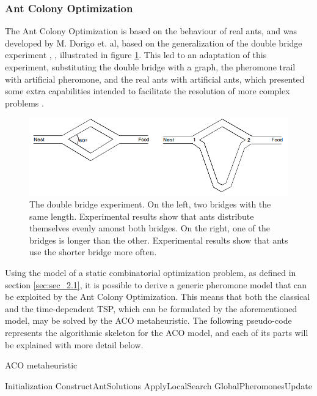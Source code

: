\subsubsection{Ant Colony Optimization}
\label{sec:aco_lr}

The Ant Colony Optimization \cite{aco_original, aco_2, aco_overview_advances} is based on the behaviour of real ants, and was developed by M. Dorigo et. al, based on the generalization of the double bridge experiment \cite{double_bridge_1}, \cite{double_bridge_2}, illustrated in figure \ref{fig:double_bridge}. This led to an adaptation of this experiment, substituting the double bridge with a graph, the pheromone trail with artificial pheromone, and the real ants with artificial ants, which presented some extra capabilities intended to facilitate the resolution of more complex problems \cite{aco_overview_advances}.

\begin{figure}[htpb]
  \centering
  \includegraphics[width=\textwidth]{Figures/aco/double_bridge.png}
	\caption{The double bridge experiment. On the left, two bridges with the same length. Experimental results show that ants distribute themselves evenly amonst both bridges. 
On the right, one of the bridges is longer than the other. Experimental results show that ants use the shorter bridge more often.}
  \label{fig:double_bridge}  
\end{figure}

Using the model of a static combinatorial optimization problem, as defined in section \ref{sec:sec_2.1}, it is possible to derive a generic pheromone model that can be exploited by the Ant Colony Optimization. This means that both the classical and the time-dependent TSP, which can be formulated by the aforementioned model, may be solved by the ACO metaheuristic.
The following pseudo-code represents the algorithmic skeleton for the ACO model, and each of its parts will be explained with more detail below.


\makeatletter
\def\BState{\State\hskip-\ALG@thistlm}
\makeatother

\begin{algorithm}
\caption{ACO metaheuristic}\label{eq:aco_metacode}
\begin{algorithmic}[1]
\State Initialization
\State ConstructAntSolutions
\State ApplyLocalSearch 
\State GlobalPheromonesUpdate
\EndWhile
\EndProcedure
\end{algorithmic}
\end{algorithm}


